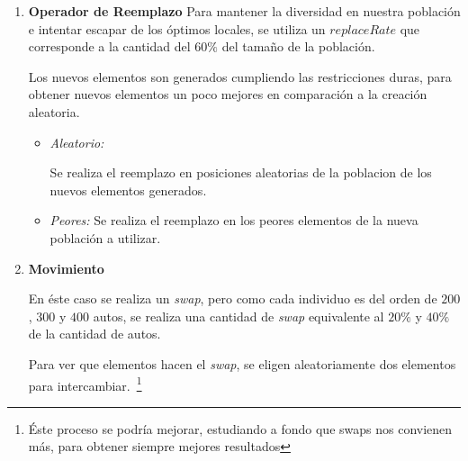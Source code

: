 \begin{enumerate}
\begin{itemize}
		\end{itemize}
	\item \textbf{Operador de Reemplazo}
		Para mantener la diversidad en nuestra población e intentar escapar de los óptimos locales,
		se utiliza un $replaceRate$ que corresponde a la cantidad del $60\%$ del tamaño de la población.

		Los nuevos elementos son generados cumpliendo las restricciones duras, para obtener nuevos
		elementos un poco mejores en comparación a la creación aleatoria.
		\begin{itemize}
			\item \emph{Aleatorio:}
 
				Se realiza el reemplazo en posiciones aleatorias de la poblacion de los nuevos elementos
				generados.

			\item \emph{Peores:}
				Se realiza el reemplazo en los peores elementos de la nueva población a utilizar.

		\end{itemize}
	\item \textbf{Movimiento}

		En éste caso se realiza un \emph{swap}, pero como cada individuo es del orden de $200$, $300$ y $400$ autos,
		se realiza una cantidad de \emph{swap} equivalente al $20\%$ y $40\%$ de la cantidad de autos.
	
		Para ver que elementos hacen el \emph{swap}, se eligen aleatoriamente dos elementos para intercambiar.~\footnote{
		Éste proceso se podría mejorar, estudiando a fondo que swaps nos convienen más, para obtener siempre mejores
		resultados}


\end{enumerate}
